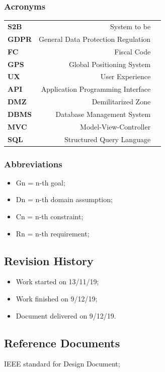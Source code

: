 \documentclass[titlepage]{article}
\begin{document}
\subsubsection{Acronyms}
\begin{tabular}{|l|rl|}
\hline

\textbf{S2B}	& System to be 	&				 			 \\
\textbf{GDPR}	& General Data Protection Regulation &	     \\
\textbf{FC}     & Fiscal Code    	&	 				 \\
\textbf{GPS}    & Global Positioning System &	 			 \\
\textbf{UX}		& User Experience & 
\\
\textbf{API}	& Application Programming Interface &
\\

\textbf{DMZ}	& Demilitarized Zone & 
\\
\textbf{DBMS}	& Database Management System &
\\
\textbf{MVC}	& Model-View-Controller &
\\
\textbf{SQL}	& Structured Query Language &
\\
\hline
\end{tabular}
\subsubsection{Abbreviations}
\begin{itemize}
	\item Gn = n-th goal;
	\item Dn = n-th domain assumption;
	\item Cn = n-th constraint;
	\item Rn = n-th requirement;
\end{itemize}
\subsection{Revision History}
\begin{itemize}
\item Work started on 13/11/19;
\item Work finished on 9/12/19;
\item Document delivered on 9/12/19.
\end{itemize}
\subsection{Reference Documents}
\item IEEE standard for Design Document;
\end{document}

